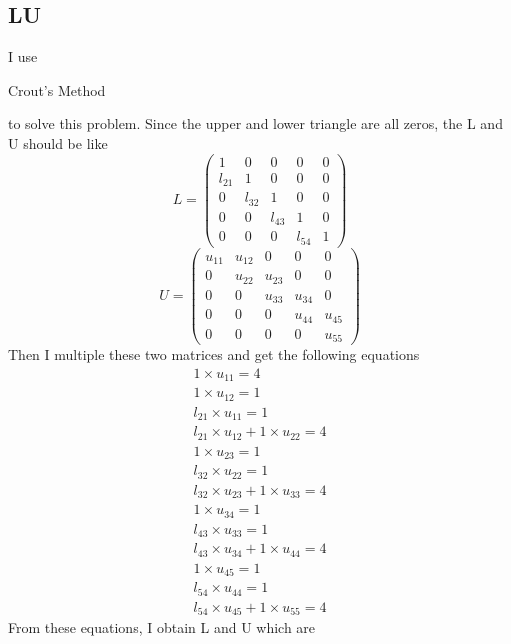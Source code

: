 \documentclass[11pt]{article}
\begin{document}
	\subsection{LU}
	I use \begin{itshape}Crout's Method\end{itshape} to solve this problem. Since the upper and lower triangle are all zeros, the L and U should be like 
	\begin{equation}L = \left(\begin{array}{ccccc}
		1 & 0 & 0 & 0 & 0\\
		l_{21} & 1 & 0 & 0 & 0\\
		0 & l_{32} & 1 & 0 & 0\\
		0 & 0 & l_{43} & 1 & 0\\
		0 & 0 & 0 & l_{54} & 1
	\end{array}\right)\end{equation}
	\begin{equation}U = \left(\begin{array}{ccccc}
		u_{11} & u_{12} & 0 & 0 & 0\\
		0 & u_{22} & u_{23} & 0 & 0\\
		0 & 0 & u_{33} & u_{34} & 0\\
		0 & 0 & 0 & u_{44} & u_{45}\\
		0 & 0 & 0 & 0 & u_{55}
	\end{array}\right)\end{equation}
	Then I multiple these two matrices and get the following equations
	\begin{eqnarray*}
		1\times u_{11} = 4\\
		1\times u_{12} = 1\\
		l_{21}\times u_{11} = 1\\
		l_{21}\times u_{12} + 1\times u_{22} = 4\\
		1\times u_{23} = 1\\
		l_{32}\times u_{22} = 1\\
		l_{32}\times u_{23} + 1\times u_{33} = 4\\
		1\times u_{34} = 1\\
		l_{43}\times u_{33} = 1\\
		l_{43}\times u_{34} + 1\times u_{44} = 4\\
		1\times u_{45} = 1\\
		l_{54}\times u_{44} = 1\\
		l_{54}\times u_{45} + 1\times u_{55} = 4
	\end{eqnarray*}
	From these equations, I obtain L and U which are
\end{document}
